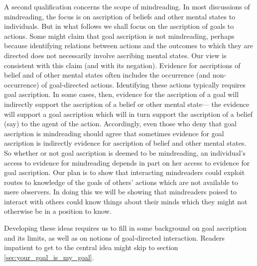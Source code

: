 \documentclass[12pt,\papersize]{extarticle}
\begin{document}
A second qualification concerns the scope of mindreading.
In most discussions of mindreading, the focus is on  ascription of beliefs and other mental states to individuals.
But in what follows we shall focus on the ascription of goals to actions.
Some might claim that goal ascription is not mindreading, perhaps because 
identifying relations between actions and the outcomes to which they are directed
does not necessarily involve ascribing mental states.
Our view is consistent with this claim (and with its negation).
\label{goal_ascription_verify}
Evidence for ascriptions of belief and of other mental states often includes the occurrence (and non-occurrence) of goal-directed actions.
Identifying these actions typically requires goal ascription.
In some cases, then, 
evidence for the ascription of a goal
will indirectly support the ascription of a belief or other mental state---%
the evidence will support  a goal ascription which will in turn support the ascription of a belief (say) to the agent of the action.
Accordingly, even those who deny that goal ascription is mindreading should agree that sometimes evidence for goal ascription is indirectly evidence for ascription of belief and other mental states.
So whether or not goal ascription is deemed to be mindreading,
an individual's access to evidence for mindreading  depends in part on her access to evidence for goal ascription.
Our plan is to show that interacting mindreaders could exploit routes to knowledge of the goals of others' actions which are not available to mere observers.
In doing this we will be showing that
mindreaders poised to interact with others 
could know things about their minds 
which they might not otherwise be in a position to know.


Developing these ideas requires us to fill in some background on goal ascription and its limits, as well as on notions of goal-directed interaction.
Readers impatient to get to the central idea might skip to section \vref{sec:your_goal_is_my_goal}.
\end{document}
